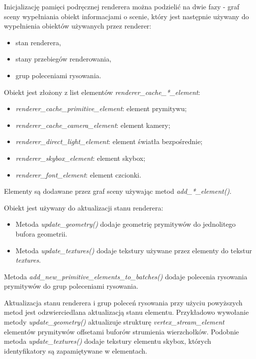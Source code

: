 Inicjalizację pamięci podręcznej renderera można podzielić na dwie fazy - graf sceny wypełniania obiekt informacjami o scenie, który jest następnie używany do wypełnienia obiektów używanych przez renderer:
\begin{itemize}
	\item stan renderera,
	\item stany przebiegów renderowania,
	\item grup poleceniami rysowania.
\end{itemize}

Obiekt jest złożony z list elementów \textit{renderer\_cache\_*\_element}:
\begin{itemize}
	\item \textit{renderer\_cache\_primitive\_element}: element prymitywu;
	\item \textit{renderer\_cache\_camera\_element}: element kamery;
	\item \textit{renderer\_direct\_light\_element}: element światła bezpośrednie;
	\item \textit{renderer\_skybox\_element}: element skybox;
	\item \textit{renderer\_font\_element}: element czcionki.
\end{itemize}
Elementy są dodawane przez graf sceny używając metod \textit{add\_*\_element()}.

Obiekt jest używany do aktualizacji stanu renderera:
\begin{itemize}
	\item Metoda \textit{update\_geometry()} dodaje geometrię prymitywów do jednolitego bufora geometrii.
	\item Metoda \textit{update\_textures()} dodaje tekstury używane przez elementy do tekstur \textit{textures}.
\end{itemize}

\item Metoda \textit{add\_new\_primitive\_elements\_to\_batches()} dodaje polecenia rysowania prymitywów do grup poleceniami rysowania.

Aktualizacja stanu renderera i grup poleceń rysowania przy użyciu powyższych metod jest odzwierciedlana aktualizacją stanu elementu.
Przykładowo wywołanie metody \textit{update\_geometry()} aktualizuje strukturę \textit{vertex\_stream\_element} elementów prymitywów offsetami buforów strumienia wierzchołków.
Podobnie metoda \textit{update\_textures()} dodaje tekstury elementu skybox, których identyfikatory są zapamiętywane w elementach.

